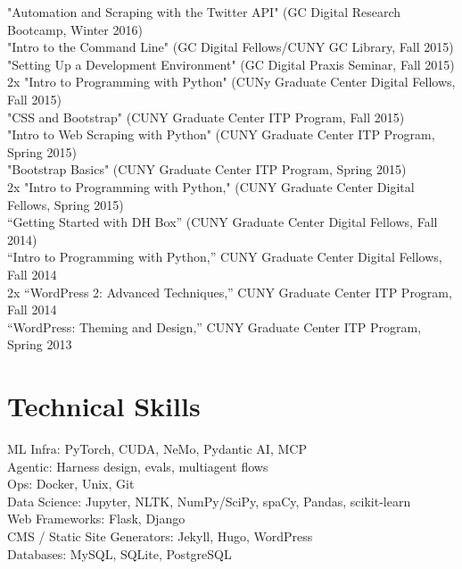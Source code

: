 \documentclass[11pt]{article}
\begin{document}
"Automation and Scraping with the Twitter API" (GC Digital Research Bootcamp, Winter 2016)\\[0pt]
"Intro to the Command Line" (GC Digital Fellows/CUNY GC Library, Fall 2015)\\[0pt]
"Setting Up a Development Environment" (GC Digital Praxis Seminar, Fall 2015)\\[0pt]
2x "Intro to Programming with Python" (CUNy Graduate Center Digital Fellows, Fall 2015)\\[0pt]
"CSS and Bootstrap" (CUNY Graduate Center ITP Program, Fall 2015)\\[0pt]
"Intro to Web Scraping with Python" (CUNY Graduate Center ITP Program, Spring 2015)\\[0pt]
"Bootstrap Basics" (CUNY Graduate Center ITP Program, Spring 2015)\\[0pt]
2x "Intro to Programming with Python," (CUNY Graduate Center Digital Fellows, Spring 2015)\\[0pt]
“Getting Started with DH Box” (CUNY Graduate Center Digital Fellows, Fall 2014)\\[0pt]
“Intro to Programming with Python,” CUNY Graduate Center Digital Fellows, Fall 2014\\[0pt]
2x “WordPress 2: Advanced Techniques,” CUNY Graduate Center ITP Program, Fall 2014\\[0pt]
“WordPress: Theming and Design,” CUNY Graduate Center ITP Program, Spring 2013\\[0pt]

\section*{Technical Skills}
\label{sec:orge24185a}

ML Infra: PyTorch, CUDA, NeMo, Pydantic AI, MCP\\[0pt]
Agentic: Harness design, evals, multiagent flows\\[0pt]
Ops: Docker, Unix, Git\\[0pt]
Data Science: Jupyter, NLTK, NumPy/SciPy, spaCy, Pandas, scikit-learn\\[0pt]
Web Frameworks: Flask, Django\\[0pt]
CMS / Static Site Generators: Jekyll, Hugo, WordPress\\[0pt]
Databases: MySQL, SQLite, PostgreSQL\\[0pt]
\end{document}
